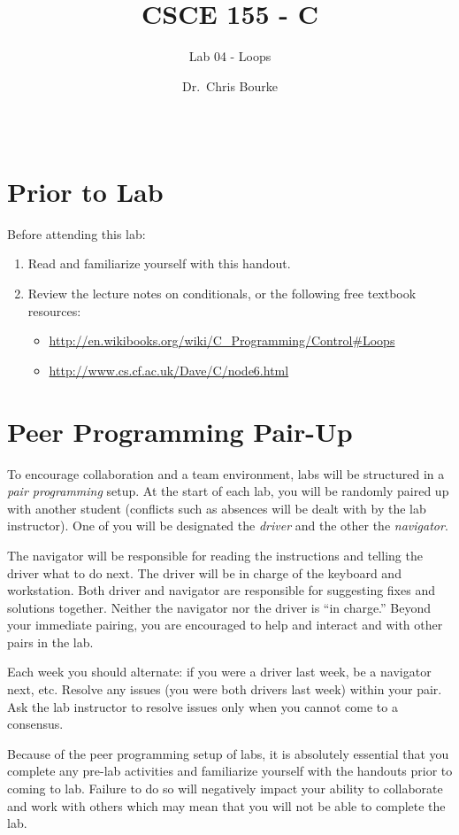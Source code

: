 \documentclass[12pt]{scrartcl}
\title{CSCE 155 - C}
\subtitle{Lab 04 - Loops}
\author{Dr.\ Chris Bourke}
\date{~}
\begin{document}
\maketitle

\section*{Prior to Lab}

Before attending this lab:
\begin{enumerate}
  \item Read and familiarize yourself with this handout.
  \item Review the lecture notes on conditionals, or the following free textbook resources:
	\begin{itemize}
  	  \item \url{http://en.wikibooks.org/wiki/C_Programming/Control#Loops}
	  \item \url{http://www.cs.cf.ac.uk/Dave/C/node6.html}
	\end{itemize}
\end{enumerate}

\section*{Peer Programming Pair-Up}

To encourage collaboration and a team environment, labs will be
structured in a \emph{pair programming} setup.  At the start of
each lab, you will be randomly paired up with another student 
(conflicts such as absences will be dealt with by the lab instructor).
One of you will be designated the \emph{driver} and the other
the \emph{navigator}.  

The navigator will be responsible for reading the instructions and
telling the driver what to do next.  The driver will be in charge of the
keyboard and workstation.  Both driver and navigator are responsible
for suggesting fixes and solutions together.  Neither the navigator
nor the driver is ``in charge.''  Beyond your immediate pairing, you
are encouraged to help and interact and with other pairs in the lab.

Each week you should alternate: if you were a driver last week, 
be a navigator next, etc.  Resolve any issues (you were both drivers
last week) within your pair.  Ask the lab instructor to resolve issues
only when you cannot come to a consensus.  

Because of the peer programming setup of labs, it is absolutely 
essential that you complete any pre-lab activities and familiarize
yourself with the handouts prior to coming to lab.  Failure to do
so will negatively impact your ability to collaborate and work with 
others which may mean that you will not be able to complete the
lab.  
\end{document}
